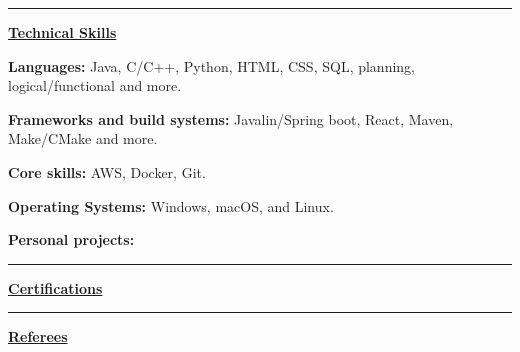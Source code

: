 \documentclass[11pt,a4paper]{article}
\newcommand{\resumerule}{%
    \par\noindent\hspace*{3pt}%
    \textcolor{rulegray}{\rule{\dimexpr\textwidth-3pt\relax}{1pt}}\par
}
\newcommand{\resumesection}[1]{%
    \par\vspace{-1.7pt}%
    \resumerule
    \vspace{0.5pt}%
    \noindent\textbf{\underline{#1}}\par
}
\begin{document}
\textellipsis

\vspace{2pt}

\resumesection{Technical Skills}

\textbf{Languages:} Java, C/C++, Python, HTML, CSS, SQL, planning, logical/functional and more.\par
\textbf{Frameworks and build systems:} Javalin/Spring boot, React, Maven, Make/CMake and more.\par
\textbf{Core skills:} AWS, Docker, Git.\par
\vspace{1pt}
\textbf{Operating Systems:} Windows, macOS, and Linux.\par
\vspace{1pt}
\textbf{Personal projects:}
\begin{resumelist}
    \item \textellipsis
\end{resumelist}

\vspace{2.5pt}

\resumesection{Certifications}

\begin{resumelist}
    \item \textellipsis
\end{resumelist}

\resumesection{Referees}

\nocite{*}
\printbibliography[heading=none]
\end{document}

